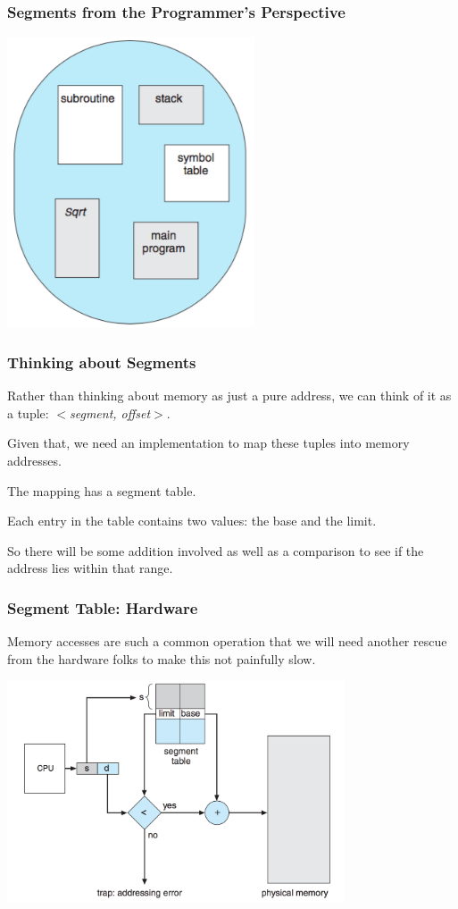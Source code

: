 \begin{frame}
\frametitle{Segments from the Programmer's Perspective}

\begin{center}
\includegraphics[width=0.55\textwidth]{images/segments.png}
\end{center}


\end{frame}

\begin{frame}
\frametitle{Thinking about Segments}

Rather than thinking about memory as just a pure address, we can think of it as a tuple: \textit{$<$segment, offset$>$}. 

Given that, we need an implementation to map these tuples into memory addresses. 

The mapping has a segment table.

Each entry in the table contains two values: the base and the limit.

So there will be some addition involved as well as a comparison to see if the address lies within that range.

\end{frame}

\begin{frame}
\frametitle{Segment Table: Hardware}

Memory accesses are such a common operation that we will need another rescue from the hardware folks to make this not painfully slow.

\begin{center}
\includegraphics[width=0.75\textwidth]{images/segmentation-hardware.png}
\end{center}

\end{frame}

